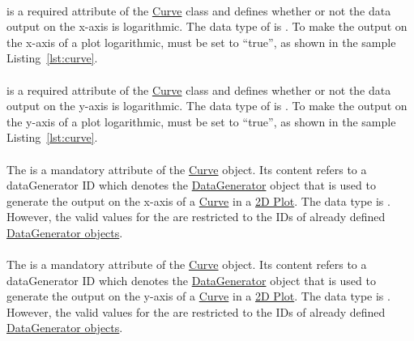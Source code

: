 \paragraph{}
\label{sec:logX}
 is a required attribute of the \hyperref[class:curve]{Curve} class and defines whether or not the data output on the x-axis is logarithmic. The data type of  is . 
To make the output on the x-axis of a plot logarithmic,  must be set to ``true'', as shown in the sample Listing~\ref{lst:curve}.

\paragraph{}
\label{sec:logY}
 is a required attribute of the \hyperref[class:curve]{Curve} class and defines whether or not the data output on the y-axis is logarithmic. The data type of  is . 
To make the output on the y-axis of a plot logarithmic,  must be set to ``true'', as shown in the sample Listing~\ref{lst:curve}. 

\paragraph{}
\label{sec:xDataReference}
The  is a mandatory attribute of the \hyperref[class:curve]{Curve} object. Its content refers to a dataGenerator ID which denotes the \hyperref[class:dataGenerator]{DataGenerator} object that is used to generate the output on the x-axis of a \hyperref[class:curve]{Curve} in a \hyperref[class:plot2D]{2D Plot}. 
The  data type is . However, the valid values for the  are restricted to the IDs of already defined \hyperref[class:dataGenerator]{DataGenerator objects}.

\paragraph{}
\label{sec:yDataReference}
The  is a mandatory attribute of the \hyperref[class:curve]{Curve} object. Its content refers to a dataGenerator ID which denotes the \hyperref[class:dataGenerator]{DataGenerator} object that is used to generate the output on the y-axis of a \hyperref[class:curve]{Curve} in a \hyperref[class:plot2D]{2D Plot}.
The  data type is . However, the valid values for the  are restricted to the IDs of already defined \hyperref[class:dataGenerator]{DataGenerator objects}.



